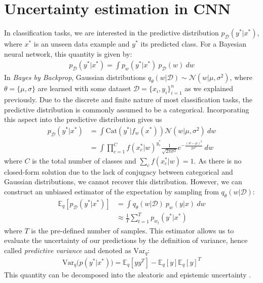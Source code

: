\section{Uncertainty estimation in CNN}
In classification tasks, we are interested in the predictive distribution $p_{\mathcal{D}}(y^*|x^*)$, where $x^*$ is an unseen data example and $y^*$ its predicted class. For a Bayesian neural network, this quantity is given by:
\begin{align}
p_{ \mathcal{D}}(y^*|x^*) = \int p_{w}(y^*|x^*) \ p_{\mathcal{D}}(w) \ dw
\end{align}
%
In \textit{Bayes by Backprop}, Gaussian distributions $q_{\theta}(w|\mathcal{D}) \sim \mathcal{N}(w|\mu, \sigma^2)$, where $\theta = \{ \mu, \sigma \}$ are learned with some dataset $\mathcal{D} = \{ x_{i}, y_{i} \}_{i=1}^{n}$ as we explained previously. Due to the discrete and finite nature of most classification tasks, the predictive distribution is commonly assumed to be a categorical. Incorporating this aspect into the predictive distribution gives us
\begin{align}
p_{\mathcal{D}}(y^*|x^*)& = \int \text{Cat}(y^*|f_w(x^*)) \mathcal{N}(w|\mu, \sigma^2) \ dw\\
&=  \int \prod_{c=1}^{C} f(x_{c}^*|w)^{y_{c}^*} \frac{1}{\sqrt{2\pi \sigma^2}} e^{-\frac{(w - \mu)^2}{2\sigma^2}} \ dw 
\end{align}
where $C$ is the total number of classes and $\sum_c f(x_{c}^*|w) = 1$.
\newline As there is no closed-form solution due to the lack of conjugacy between categorical and Gaussian distributions, we cannot recover this distribution. However, we can construct an unbiased estimator of the expectation by sampling from $q_{\theta}(w|\mathcal{D})$:
\begin{align}
\mathbb{E}_{q}[p_{\mathcal{D}}(y^*|x^*)] &= \int q_{\theta}(w|\mathcal{D}) \ p_w(y|x) \ dw \\ & \approx \frac{1}{T}\sum_{t=1}^{T} p_{w_t}(y^*|x^*)
\end{align}
where $T$ is the pre-defined number of samples.
This estimator allows us to evaluate the uncertainty of our predictions by the definition of variance, hence called \textit{predictive variance} and denoted as $\text{Var}_q$:
\begin{align} \label{variance}
\text{Var}_q\big( p(y^*|x^*) \big) = \mathbb{E}_q[yy^T] - \mathbb{E}_q[y]\mathbb{E}_q[y]^T
\end{align}
This quantity can be decomposed into the aleatoric and epistemic uncertainty \cite{kendall2017uncertainties,kwon2018uncertainty}. 
